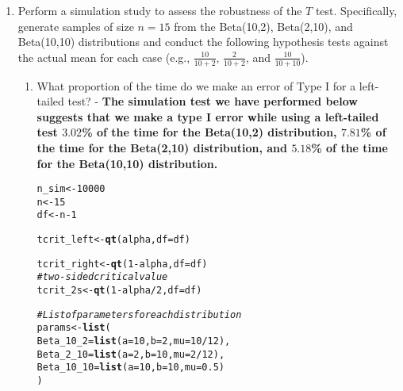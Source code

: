 \documentclass{article}\usepackage[]{graphicx}\usepackage[]{xcolor}
\makeatletter
\newcommand{\hlnum}[1]{\textcolor[rgb]{0.686,0.059,0.569}{#1}}%
\newcommand{\hlcom}[1]{\textcolor[rgb]{0.678,0.584,0.686}{\textit{#1}}}%
\newcommand{\hlopt}[1]{\textcolor[rgb]{0,0,0}{#1}}%
\newcommand{\hldef}[1]{\textcolor[rgb]{0.345,0.345,0.345}{#1}}%
\newcommand{\hlkwb}[1]{\textcolor[rgb]{0.69,0.353,0.396}{#1}}%
\newcommand{\hlkwc}[1]{\textcolor[rgb]{0.333,0.667,0.333}{#1}}%
\newcommand{\hlkwd}[1]{\textcolor[rgb]{0.737,0.353,0.396}{\textbf{#1}}}%
\newenvironment{kframe}{%
 \def\at@end@of@kframe{}%
 \ifinner\ifhmode%
  \def\at@end@of@kframe{\end{minipage}}%
  \begin{minipage}{\columnwidth}%
 \fi\fi%
 \def\FrameCommand##1{\hskip\@totalleftmargin \hskip-\fboxsep
 \colorbox{shadecolor}{##1}\hskip-\fboxsep
     \hskip-\linewidth \hskip-\@totalleftmargin \hskip\columnwidth}%
 \MakeFramed {\advance\hsize-\width
   \@totalleftmargin\z@ \linewidth\hsize
   \@setminipage}}%
 {\par\unskip\endMakeFramed%
 \at@end@of@kframe}
\newenvironment{knitrout}{}{} %
\makeatother
\begin{document}
\begin{enumerate}
\begin{enumerate}
\end{enumerate}
  \item Perform a simulation study to assess the robustness of the $T$ test. 
  Specifically, generate samples of size $n=15$ from the Beta(10,2), Beta(2,10), 
  and Beta(10,10) distributions and conduct the following hypothesis tests against 
  the actual mean for each case (e.g., $\frac{10}{10+2}$, $\frac{2}{10+2}$, and 
  $\frac{10}{10+10}$). 
  

  \begin{enumerate}
    \item What proportion of the time do we make an error of Type I for a
    left-tailed test? - \textbf{The simulation test we have performed below suggests that we make a type I error while using a left-tailed test $3.02$\% of the time for the Beta(10,2) distribution, $7.81$\% of the time for the Beta(2,10) distribution, and $5.18$\% of the time for the Beta(10,10) distribution.}
\begin{knitrout}\scriptsize
{}\color{fgcolor}\begin{kframe}
\begin{alltt}
\hldef{n_sim}      \hlkwb{<-} \hlnum{10000}
\hldef{n}          \hlkwb{<-} \hlnum{15}
\hldef{df}         \hlkwb{<-} \hldef{n} \hlopt{-} \hlnum{1}

\hldef{tcrit_left} \hlkwb{<-} \hlkwd{qt}\hldef{(alpha,} \hlkwc{df}\hldef{=df)}

\hldef{tcrit_right} \hlkwb{<-} \hlkwd{qt}\hldef{(}\hlnum{1} \hlopt{-} \hldef{alpha,} \hlkwc{df} \hldef{= df)}
\hlcom{# two‐sided critical value}
\hldef{tcrit_2s}   \hlkwb{<-} \hlkwd{qt}\hldef{(}\hlnum{1} \hlopt{-} \hldef{alpha}\hlopt{/}\hlnum{2}\hldef{,} \hlkwc{df} \hldef{= df)}

\hlcom{#List of parameters for each distribution}
\hldef{params} \hlkwb{<-} \hlkwd{list}\hldef{(}
\hlkwc{Beta_10_2}  \hldef{=} \hlkwd{list}\hldef{(}\hlkwc{a}\hldef{=}\hlnum{10}\hldef{,} \hlkwc{b}\hldef{=}\hlnum{2}\hldef{,}  \hlkwc{mu}\hldef{=}\hlnum{10}\hlopt{/}\hlnum{12}\hldef{),}
\hlkwc{Beta_2_10}  \hldef{=} \hlkwd{list}\hldef{(}\hlkwc{a}\hldef{=}\hlnum{2}\hldef{,}  \hlkwc{b}\hldef{=}\hlnum{10}\hldef{,} \hlkwc{mu}\hldef{=}\hlnum{2}\hlopt{/}\hlnum{12}\hldef{),}
\hlkwc{Beta_10_10} \hldef{=} \hlkwd{list}\hldef{(}\hlkwc{a}\hldef{=}\hlnum{10}\hldef{,} \hlkwc{b}\hldef{=}\hlnum{10}\hldef{,}\hlkwc{mu}\hldef{=}\hlnum{0.5}\hldef{)}
\hldef{)}


\end{alltt}
\end{kframe}
\end{knitrout}
\end{enumerate}
\end{enumerate}
\end{document}
